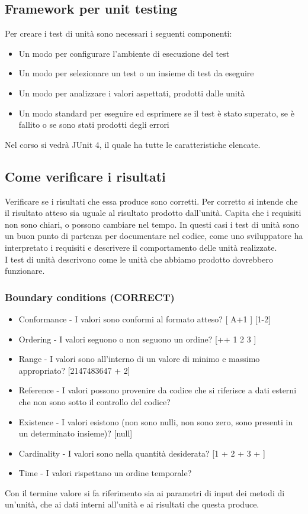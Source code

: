 \documentclass[10pt, a4paper]{article}
\begin{document}
\subsection{Framework per unit testing}
Per creare i test di unità sono necessari i seguenti componenti:
\begin{itemize}
\item Un modo per configurare l’ambiente di esecuzione del test
\item Un modo per selezionare un test o un insieme di test da eseguire
\item Un modo per analizzare i valori aspettati, prodotti dalle unità
\item Un modo standard per eseguire ed esprimere se il test è stato superato, se è fallito o
se sono stati prodotti degli errori
\end{itemize}
Nel corso si vedrà JUnit 4, il quale ha tutte le caratteristiche elencate.

\subsection{Come verificare i risultati}
Verificare se i risultati che essa produce sono corretti.
Per corretto si intende che il risultato atteso sia uguale al risultato prodotto dall’unità.
Capita che i requisiti non sono chiari, o possono cambiare nel tempo. In questi casi i test
di unità sono un buon punto di partenza per documentare nel codice, come uno
sviluppatore ha interpretato i requisiti e descrivere il comportamento delle unità
realizzate.\\
I test di unità descrivono come le unità che abbiamo prodotto dovrebbero funzionare.

\subsubsection*{Boundary conditions (CORRECT)}
\begin{itemize}
\item Conformance - I valori sono conformi al formato atteso? [ A+1 ] [1-2]
\item Ordering - I valori seguono o non seguono un ordine? [++ 1 2 3 ]
\item Range - I valori sono all’interno di un valore di minimo e massimo appropriato?
[2147483647 + 2]
\item Reference - I valori possono provenire da codice che si riferisce a dati esterni che non
sono sotto il controllo del codice?
\item Existence - I valori esistono (non sono nulli, non sono zero, sono presenti in un
determinato insieme)? [null]
\item Cardinality - I valori sono nella quantità desiderata? [1 + 2 + 3 + ]
\item Time - I valori rispettano un ordine temporale?
\end{itemize}
Con il termine valore si fa riferimento sia ai parametri di input dei metodi di un'unità, che ai dati interni all'unità e ai risultati che questa produce.
\end{document}
